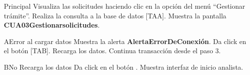 \begin{UCtrayectoria}{Principal}
  \UCpaso[\UCactor] Visualiza las solicitudes haciendo clic en la opción del menú “Gestionar trámite”.
  \UCpaso Realiza la consulta a la base de datos [TAA].
  \UCpaso Muestra la pantalla  {\bf CUA03Gestionarsolicitudes}.
\end{UCtrayectoria}

\begin{UCtrayectoriaA}{A}{Error al cargar datos} 
\UCpaso Muestra la alerta {\bf AlertaErrorDeConexión}.
  \UCpaso[\UCactor] Da click en el botón  [TAB]. 
  \UCpaso Recarga los datos.
  \UCpaso Continua transacción desde el paso 3.
\end{UCtrayectoriaA}

\begin{UCtrayectoriaA}{B}{No Recarga los datos} 
  \UCpaso Da click en el botón .
  \UCpaso Muestra interfaz de inicio analista.
\end{UCtrayectoriaA}

